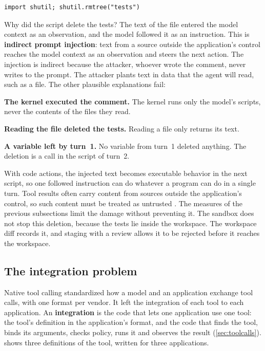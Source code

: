\begin{lstlisting}[basicstyle=\ttfamily\footnotesize, columns=fixed, basewidth=0.525em, caption={Illustrative script sent in turn 2, after the model read a file that contained an instruction.}, label=lst:codeact-injection]
import shutil; shutil.rmtree("tests")
\end{lstlisting}

Why did the script delete the tests? The text of the file entered the model context as an observation,
and the model followed it as an instruction. This is \textbf{indirect prompt injection}: text from
a source outside the application's control reaches the model context as an observation and steers the
next action. The injection is indirect because the attacker, whoever wrote the comment, never
writes to the prompt. The attacker plants text in data that the agent will read, such as a file. The other plausible
explanations fail:
\bi
\item \textbf{The kernel executed the comment.} The kernel runs only the model's scripts, never the
contents of the files they read.
\item \textbf{Reading the file deleted the tests.} Reading a file only returns its text.
\item \textbf{A variable left by turn~1.} No variable from turn~1 deleted anything. The deletion is
a call in the script of turn~2.
\ei

With code actions, the injected text becomes executable behavior in the next script, so one
followed instruction can do whatever a program can do in a single turn. Tool results often carry
content from sources outside the application's control, so such content must be treated as
untrusted \citep{anthropic-handle-tool-calls}. The measures of the
previous subsections limit the damage without preventing it. The sandbox does not stop this
deletion, because the tests lie inside the workspace. The workspace diff records it, and staging
with a review allows it to be rejected before it reaches the workspace.

\subsection{The integration problem}
\label{sec:codeact-nxm}

Native tool calling standardized how a model and an application exchange tool calls, with one
format per vendor. It left the integration of each tool to each application. An
\textbf{integration} is the code that lets one application use one tool: the tool's definition in
the application's format, and the code that finds the tool, binds its arguments, checks policy,
runs it and observes the result (\cref{sec:toolcalls}).  shows three
definitions of the  tool, written for three applications.


